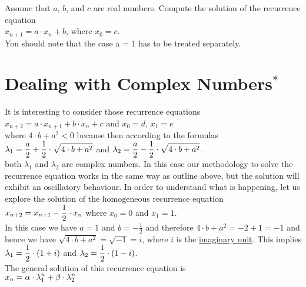 \exercise
Assume that $a$, $b$, and $c$ are real numbers.  Compute the solution of the recurrence equation
\\[0.2cm]
\hspace*{1.3cm}
$x_{n+1} = a \cdot x_n + b$, \quad where $x_0 = c$.
\\[0.2cm]
You should note that the case a = 1 has to be treated separately. 
\eox

\section{Dealing with Complex Numbers$^*$}
It is interesting to consider those recurrence equations 
\\[0.2cm]
\hspace*{1.3cm}
$x_{n+2} = a \cdot x_{n+1} + b \cdot x_n + c$ \quad and \quad $x_0 = d$, $x_1 = e$
\\[0.2cm]
where $4 \cdot b + a^2 < 0$ because then according to the formulas
\\[0.2cm]
\hspace*{1.3cm}
$\displaystyle\lambda_1 = \frac{a}{2} + \frac{1}{2} \cdot \sqrt{4 \cdot b + a^2}$ \quad and \quad
$\displaystyle\lambda_2 = \frac{a}{2} - \frac{1}{2} \cdot \sqrt{4 \cdot b + a^2}$.
\\[0.2cm]
both $\lambda_1$ and $\lambda_2$ are complex numbers.  In this case our methodology to solve the
recurrence equation works in the same way as outline above, but the solution will exhibit an oscillatory
behaviour.  In order to understand what is happening, let us explore the solution of the homogeneous recurrence
equation 
\\[0.2cm]
\hspace*{1.3cm}
$\displaystyle x_{n+2} = x_{n+1} - \frac{1}{2} \cdot x_n$ \quad where $x_0 = 0$ and $x_1 = 1$.
\\[0.2cm]
In this case we have $a = 1$ and $b = -\frac{1}{2}$ and therefore $4 \cdot b + a^2 = -2 + 1 = -1$ and hence we
have $\sqrt{4 \cdot b + a^2} = \sqrt{-1} = i$, where $i$ is the
\href{https://en.wikipedia.org/wiki/Imaginary_unit}{imaginary unit}.  
This implies
\\[0.2cm]
\hspace*{1.3cm}
$\displaystyle\lambda_1 = \frac{1}{2} \cdot (1 + i)$ \quad and \quad $\displaystyle\lambda_2 = \frac{1}{2} \cdot (1 - i)$.
\\[0.2cm]
The general solution of this recurrence equation is
\\[0.2cm]
\hspace*{1.3cm}
$\displaystyle x_n = \alpha \cdot \lambda_1^n + \beta \cdot \lambda_2^n$

